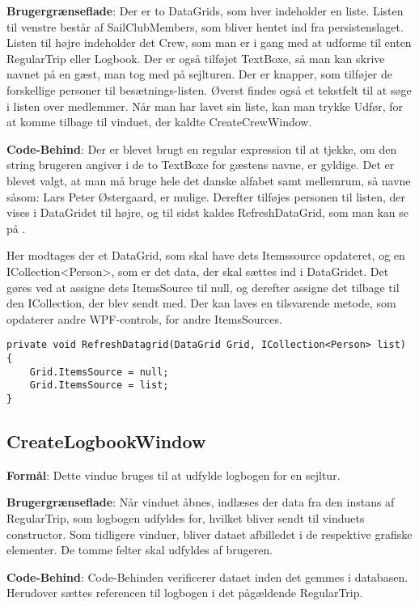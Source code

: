 \textbf{Brugergrænseflade}: 
Der er to DataGrids, som hver indeholder en liste. 
Listen til venstre består af SailClubMembers, som bliver hentet ind fra persistenslaget.
Listen til højre indeholder det Crew, som man er i gang med at udforme til enten RegularTrip eller Logbook. 
Der er også tilføjet TextBoxe, så man kan skrive navnet på en gæst, man tog med på sejlturen. 
Der er knapper, som tilføjer de forskellige personer til besætnings-listen. 
Øverst findes også et tekstfelt til at søge i listen over medlemmer. 
Når man har lavet sin liste, kan man trykke Udfør, for at komme tilbage til vinduet, der kaldte CreateCrewWindow.

\textbf{Code-Behind}: 
Der er blevet brugt en regular expression til at tjekke, om den string brugeren angiver i de to TextBoxe for gæstens navne, er gyldige. 
Det er blevet valgt, at man må bruge hele det danske alfabet samt mellemrum, så navne såsom: Lars Peter Østergaard, er mulige.
Derefter tilføjes personen til listen, der vises i DataGridet til højre, og til sidst kaldes RefreshDataGrid, som man kan se på .

Her modtages der et DataGrid, som skal have dets Itemssource opdateret, og en ICollection<Person>, som er det data, der skal sættes ind i DataGridet. 
Det gøres ved at assigne dets ItemsSource til null, og derefter assigne det tilbage til den ICollection, der blev sendt med. 
Der kan laves en tilsvarende metode, som opdaterer andre WPF-controls, for andre ItemsSources.

\begin{lstlisting}[frame=single, caption=Refresh Datagrid, label=RefreshDatagrid]
private void RefreshDatagrid(DataGrid Grid, ICollection<Person> list)
{
    Grid.ItemsSource = null;
    Grid.ItemsSource = list;
}
\end{lstlisting}

\subsection{CreateLogbookWindow}

\textbf{Formål}: 
Dette vindue bruges til at udfylde logbogen for en sejltur.

\textbf{Brugergrænseflade}:  
Når vinduet åbnes, indlæses der data fra den instans af RegularTrip, som logbogen udfyldes for, hvilket bliver sendt til vinduets constructor.
Som tidligere vinduer, bliver dataet afbilledet i de respektive grafiske elementer. 
De tomme felter skal udfyldes af brugeren.

\textbf{Code-Behind}: 
Code-Behinden verificerer dataet inden det gemmes i databasen.
Herudover sættes referencen til logbogen i det pågældende RegularTrip.

